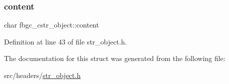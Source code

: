 \mbox{\label{structfbgc__cstr__object_adb7a9cca68a974eaac8afc50922db473}} 
\subsubsection{\texorpdfstring{content}{content}}
{\footnotesize\ttfamily char fbgc\+\_\+cstr\+\_\+object\+::content}



Definition at line 43 of file str\+\_\+object.\+h.



The documentation for this struct was generated from the following file\+:\begin{DoxyCompactItemize}
\item 
src/headers/\hyperlink{str__object_8h}{str\+\_\+object.\+h}\end{DoxyCompactItemize}
